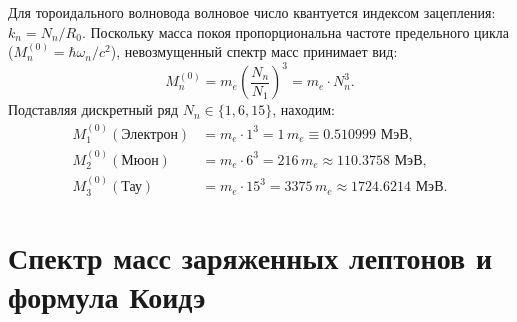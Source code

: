 \documentclass[11pt,a4paper]{article}
\theoremstyle{definition}
\theoremstyle{remark}
\begin{document}
Для тороидального волновода волновое число квантуется индексом зацепления: $k_n = N_n / R_0$. Поскольку масса покоя пропорциональна частоте предельного цикла ($M_n^{(0)} = \hbar \omega_n / c^2$), невозмущенный спектр масс принимает вид:
\begin{equation}
    M_n^{(0)} = m_e \left( \frac{N_n}{N_1} \right)^3 = m_e \cdot N_n^3.
    \label{eq:bare_masses}
\end{equation}
Подставляя дискретный ряд $N_n \in \{1, 6, 15\}$, находим:
\begin{align}
    M_1^{(0)} (\text{Электрон}) &= m_e \cdot 1^3 = 1 \, m_e \equiv 0.510999 \text{ МэВ}, \\
    M_2^{(0)} (\text{Мюон})     &= m_e \cdot 6^3 = 216 \, m_e \approx 110.3758 \text{ МэВ}, \\
    M_3^{(0)} (\text{Тау})      &= m_e \cdot 15^3 = 3375 \, m_e \approx 1724.6214 \text{ МэВ}.
\end{align}


\section{Спектр масс заряженных лептонов и формула Коидэ}
\label{sec:leptons}
\end{document}
